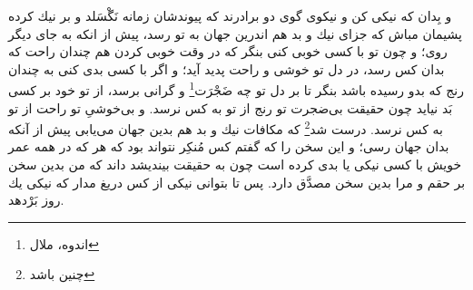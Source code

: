 و بِدان كه نيكى كن و نيكوى گوى دو برادرند كه پيوندشان زمانه نَگْسَلد و بر نيك كرده پشيمان مباش كه جزاى نيك و بد هم اندرين جهان به تو رسد، پيش از انكه به جاى ديگر روى؛ و چون تو با كسى خوبى كنى بنگر كه در وقت خوبى كردن هم چندان راحت كه بدان كس رسد، در دل تو خوشى و راحت پديد آيد؛ و اگر با كسى بدى كنى به چندان رنج كه بدو رسيده باشد بنگر تا بر دل تو چه ضَجْرَت\footnote{اندوه، ملال} و گرانى برسد، از تو خود بر كسى بَد نيايد چون حقيقت بى‌ضجرت تو رنج از تو به كس نرسد. و بى‌خوشىِ تو راحت از تو به كس نرسد. درست شد\footnote{چنین باشد} كه مكافات نيك و بد هم بدين جهان مى‌يابى پيش از آنكه بدان جهان رسى؛ و اين سخن را كه گفتم كس مُنکِر نتواند بود كه هر كه در همه عمر خويش با كسى نيكى يا بدى كرده است چون به حقيقت بينديشد داند كه من بدين سخن بر حقم و مرا بدين سخن مصدَّق دارد. پس تا بتوانى نيكى از كس دريغ مدار كه نيكى يك روز بَرْدهد.

